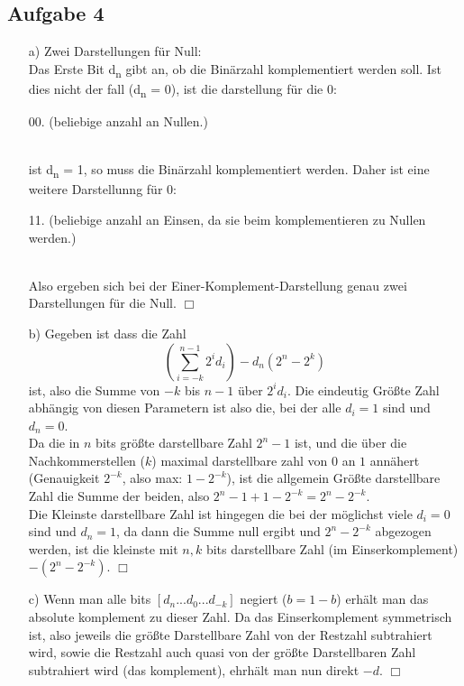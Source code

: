 \documentclass{scrartcl}
\begin{document}
	\subsection*{Aufgabe 4}
		\begin{itemize}

                \item[a)] Zwei Darstellungen für Null:\\
                Das Erste Bit d\textsubscript{n} gibt an, ob die Binärzahl komplementiert werden
                soll. Ist dies nicht der fall (d\textsubscript{n} = 0), ist die darstellung für
                die 0: \\
                \centerline{00. (beliebige anzahl an Nullen.)}\\
                ist d\textsubscript{n} = 1, so muss die Binärzahl komplementiert werden.
                Daher ist eine weitere Darstellunng für 0:\\
                \centerline{11. (beliebige anzahl an Einsen, da sie beim komplementieren zu Nullen
                werden.)}\\
                Also ergeben sich bei der Einer-Komplement-Darstellung genau zwei Darstellungen für
                die Null. \hfill $\Box$

                \item[b)]
                Gegeben ist dass die Zahl $$(\sum^{n-1}_{i=-k}2^i d_i) - d_n(2^n - 2^k)$$ ist,
                also die Summe von $-k$ bis $n-1$ über $2^id_i$. Die eindeutig Größte Zahl abhängig
                von diesen Parametern ist also die, bei der alle $d_i = 1$ sind und $d_n=0$. \\
                Da die in $n$ bits größte darstellbare Zahl $2^n -1$ ist, und die über die
                Nachkommerstellen ($k$) maximal darstellbare zahl von $0$ an $1$ annähert
                (Genauigkeit $2^{-k}$, also max: $1 - 2^{-k}$), ist die allgemein Größte
                darstellbare Zahl die Summe der beiden, also $2^n -1 + 1 - 2^{-k} = 2^n - 2^{-k}$.
                \\

                Die Kleinste darstellbare Zahl ist hingegen die bei der möglichst viele $d_i = 0$
                sind und $d_n = 1$, da dann die Summe null ergibt und $2^n - 2^{-k}$ abgezogen
                werden, ist die kleinste mit $n,k$ bits darstellbare Zahl (im Einserkomplement)
                $-(2^n - 2^{-k})$. \hfill $\Box$


		\item[c)]
                Wenn man alle bits $[d_n...d_0...d_{-k}]$ negiert ($b = 1 - b$) erhält man das
                absolute komplement zu dieser Zahl. Da das Einserkomplement symmetrisch ist,
                also jeweils die größte Darstellbare Zahl von der Restzahl subtrahiert wird,
                sowie die Restzahl auch quasi von der größte Darstellbaren
                Zahl subtrahiert wird (das komplement), ehrhält man nun direkt $-d$. \hfill $\Box$
		\end{itemize}
\end{document}
